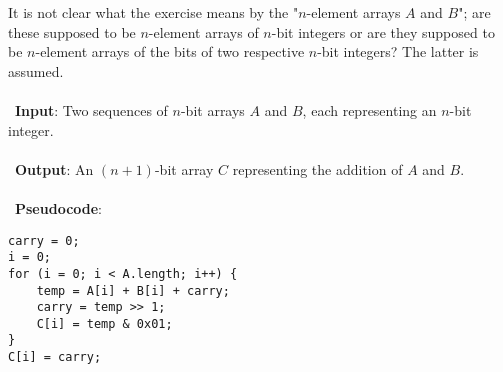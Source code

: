 It is not clear what the exercise means by the "$n$-element arrays $A$ and $B$"; are these supposed to be $n$-element arrays of $n$-bit integers or are they supposed to be $n$-element arrays of the bits of two respective $n$-bit integers? The latter is assumed.
\\ \\
\noindent~\textbf{Input}: Two sequences of $n$-bit arrays $A$ and $B$, each representing an $n$-bit integer.
\\ \\
\noindent~\textbf{Output}: An $(n + 1)$-bit array $C$ representing the addition of $A$ and $B$.
\\ \\
\noindent~\textbf{Pseudocode}:
\begin{verbatim}
carry = 0;
i = 0;
for (i = 0; i < A.length; i++) {
    temp = A[i] + B[i] + carry;
    carry = temp >> 1;
    C[i] = temp & 0x01;
}
C[i] = carry;
\end{verbatim}
